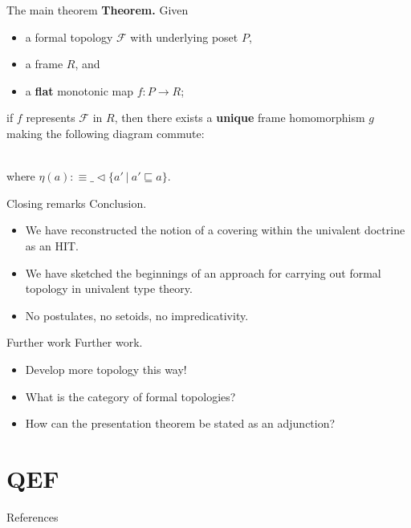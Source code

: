 \documentclass[xcolor={dvipsnames}]{beamer}
\newcommand{\fix}[2]{\mathfrak{fix}\left(#1, #2\right)}
\newcommand{\McF}{\mathcal{F}}
\newcommand{\is}{:\equiv}
\newcommand{\covers}[2]{#1 \lhd #2}
\begin{document}
\begin{frame}[fragile]{The main theorem}
  \textbf{Theorem.} Given
  \begin{itemize}
    \item a formal topology $\McF{}$ with underlying poset $P$,
    \item a frame $R$, and
    \item a \textbf{flat} monotonic map $f : P \rightarrow R$;
  \end{itemize}
  \begin{center}
    if $f$ represents $\McF{}$ in $R$, then there exists a \textbf{unique} frame
    homomorphism $g$ making the following diagram commute:
  \end{center}

  \begin{center}
    \\
    \vspace{0.5em}
    {\footnotesize where $\eta(a) \is \covers{\_}{ \{ a' ~|~ a' \sqsubseteq a \} }$.}
  \end{center}
\end{frame}

\begin{frame}{Closing remarks}
  Conclusion.
  \begin{itemize}
    \item We have reconstructed the notion of a covering within the univalent doctrine as
      an HIT.
    \item We have sketched the beginnings of an approach for carrying out formal topology
      in univalent type theory.
    \item No postulates, no setoids, no impredicativity.
  \end{itemize}
\end{frame}

\begin{frame}{Further work}
  Further work.
  \begin{itemize}
    \item Develop more topology this way!
    \item What is the category of formal topologies?
    \item How can the presentation theorem be stated as an adjunction?
  \end{itemize}
\end{frame}


\section{QEF}

\begin{frame}[noframenumbering]{References}
  \printbibliography[heading=none]
\end{frame}
\end{document}
